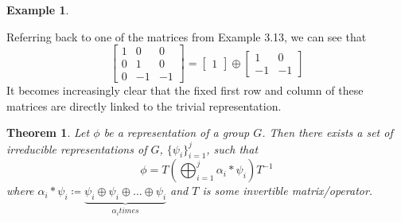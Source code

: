 \documentclass[10pt]{ucthesis}
\newtheorem{theorem}[definition]{Theorem}
\newtheorem{example}[definition]{Example}
\begin{document}
\begin{example}\end{example}
	Referring back to one of the matrices from Example 3.13, we can see that
$$\begin{bmatrix}
	1 & 0 & 0 \\
	0 & 1 & 0 \\
	0 & -1 & -1
\end{bmatrix} = \begin{bmatrix}
					1
					\end{bmatrix} \oplus
					\begin{bmatrix}
						1 & 0 \\
						-1 & -1
					\end{bmatrix}$$
It becomes increasingly clear that the fixed first row and column of these matrices are directly linked to the trivial representation.


\begin{theorem}
	Let $\phi$ be a representation of a group $G$.  Then there exists a set of irreducible representations of $G$, $\{\psi_i\}_{i=1}^j$, such that $$\phi = T\left(\bigoplus_{i=1}^j \alpha_i*\psi_i\right)T^{-1}$$ where $\alpha_i*\psi_i \coloneq \underbrace{\psi_i \oplus \psi_i \oplus \hdots \oplus \psi_i}_{\alpha_i times}$ and $T$ is some invertible matrix/operator. 
\end{theorem}
 
\end{document}
